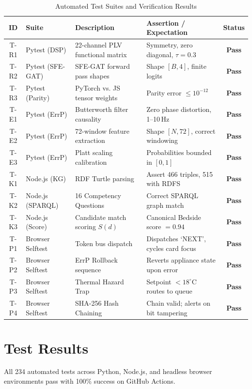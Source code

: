 \documentclass[12pt,a4paper]{report}
\begin{document}
\begin{table}[H]
\centering
\small
\caption{Automated Test Suites and Verification Results}
\label{tab:test_cases}
\begin{tabularx}{\textwidth}{c p{3.2cm} p{5.5cm} X c}
\toprule
\textbf{ID} & \textbf{Suite} & \textbf{Description} & \textbf{Assertion / Expectation} & \textbf{Status} \\
\midrule
T-R1 & Pytest (DSP) & 22-channel PLV functional matrix & Symmetry, zero diagonal, $\tau = 0.3$ & \textbf{Pass} \\
T-R2 & Pytest (SFE-GAT) & SFE-GAT forward pass shapes & Shape $[B, 4]$, finite logits & \textbf{Pass} \\
T-R3 & Pytest (Parity) & PyTorch vs. JS tensor weights & Parity error $\le 10^{-12}$ & \textbf{Pass} \\
T-E1 & Pytest (ErrP) & Butterworth filter causality & Zero phase distortion, 1--10\,Hz & \textbf{Pass} \\
T-E2 & Pytest (ErrP) & 72-window feature extraction & Shape $[N, 72]$, correct windowing & \textbf{Pass} \\
T-E3 & Pytest (ErrP) & Platt scaling calibration & Probabilities bounded in $[0, 1]$ & \textbf{Pass} \\
T-K1 & Node.js (KG) & RDF Turtle parsing & Assert 466 triples, 515 with RDFS & \textbf{Pass} \\
T-K2 & Node.js (SPARQL) & 16 Competency Questions & Correct SPARQL graph match & \textbf{Pass} \\
T-K3 & Node.js (Score) & Candidate match scoring $S(d)$ & Canonical Bedside score $= 0.94$ & \textbf{Pass} \\
T-P1 & Browser Selftest & Token bus dispatch & Dispatches `NEXT', cycles card focus & \textbf{Pass} \\
T-P2 & Browser Selftest & ErrP Rollback sequence & Reverts appliance state upon error & \textbf{Pass} \\
T-P3 & Browser Selftest & Thermal Hazard Trap & Setpoint $< 18^\circ\text{C}$ routes to queue & \textbf{Pass} \\
T-P4 & Browser Selftest & SHA-256 Hash Chaining & Chain valid; alerts on bit tampering & \textbf{Pass} \\
\bottomrule
\end{tabularx}
\end{table}

\section{Test Results}
All 234 automated tests across Python, Node.js, and headless browser environments pass with 100\% success on GitHub Actions.
\end{document}
